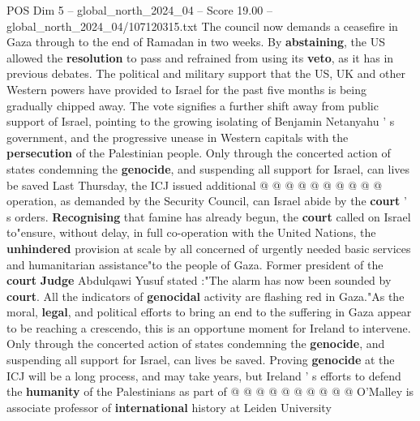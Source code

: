 \begin{textsample}{POS Dim 5 – global\_north\_2024\_04 – Score 19.00 – global\_north\_2024\_04/107120315.txt}
The council now demands a ceasefire in Gaza through to the end of Ramadan in two weeks.
By \textbf{abstaining}, the US allowed the \textbf{resolution} to pass and refrained from using its \textbf{veto}, as it has in previous debates.
The political and military support that the US, UK and other Western powers have provided to Israel for the past five months is being gradually chipped away.
The vote signifies a further shift away from public support of Israel, pointing to the growing isolating of Benjamin Netanyahu ' s government, and the progressive unease in Western capitals with the \textbf{persecution} of the Palestinian people.
Only through the concerted action of states condemning the \textbf{genocide}, and suspending all support for Israel, can lives be saved Last Thursday, the ICJ issued additional @ @ @ @ @ @ @ @ @ @ operation, as demanded by the Security Council, can Israel abide by the \textbf{court} ' s orders. \textbf{Recognising} that famine has already begun, the \textbf{court} called on Israel to"ensure, without delay, in full co-operation with the United Nations, the \textbf{unhindered} provision at scale by all concerned of urgently needed basic services and humanitarian assistance"to the people of Gaza.
Former president of the \textbf{court} \textbf{Judge} Abdulqawi Yusuf stated :"The alarm has now been sounded by \textbf{court}.
All the indicators of \textbf{genocidal} activity are flashing red in Gaza."As the moral, \textbf{legal}, and political efforts to bring an end to the suffering in Gaza appear to be reaching a crescendo, this is an opportune moment for Ireland to intervene.
Only through the concerted action of states condemning the \textbf{genocide}, and suspending all support for Israel, can lives be saved.
Proving \textbf{genocide} at the ICJ will be a long process, and may take years, but Ireland ' s efforts to defend the \textbf{humanity} of the Palestinians as part of @ @ @ @ @ @ @ @ @ @ O'Malley is associate professor of \textbf{international} history at Leiden University

\end{textsample}
